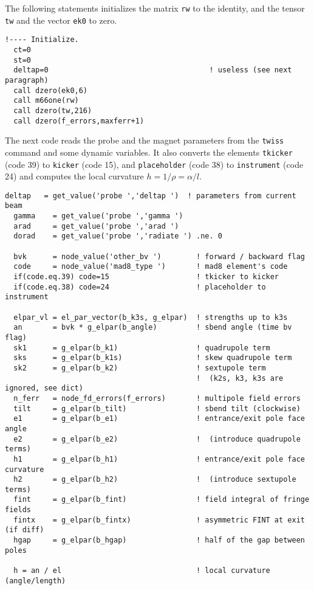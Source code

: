 \documentclass{cern-art} %
\renewcommand{\L}[1]{\lstinline[firstnumber=last]{#1}}
\begin{document}
The following statements initializes the matrix \L{rw} to the identity, and the tensor \L{tw} and the vector \L{ek0} to zero.
\begin{lstlisting}[firstnumber=last]
  !---- Initialize.
  ct=0
  st=0
  deltap=0                                     ! useless (see next paragraph)
  call dzero(ek0,6)
  call m66one(rw)
  call dzero(tw,216)
  call dzero(f_errors,maxferr+1)
\end{lstlisting}
The next code reads the probe and the magnet parameters from the \L{twiss} command and some dynamic variables. It also converts the elements \L{tkicker} (code 39) to \L{kicker} (code 15), and \L{placeholder} (code 38) to \L{instrument} (code 24) and computes the local curvature $h=1/\rho=\alpha/l$.
\begin{lstlisting}[firstnumber=last]
  deltap   = get_value('probe ','deltap ')  ! parameters from current beam
  gamma    = get_value('probe ','gamma ')
  arad     = get_value('probe ','arad ')
  dorad    = get_value('probe ','radiate ') .ne. 0
  
  bvk      = node_value('other_bv ')        ! forward / backward flag
  code     = node_value('mad8_type ')       ! mad8 element's code
  if(code.eq.39) code=15                    ! tkicker to kicker
  if(code.eq.38) code=24                    ! placeholder to instrument

  elpar_vl = el_par_vector(b_k3s, g_elpar)  ! strengths up to k3s
  an       = bvk * g_elpar(b_angle)         ! sbend angle (time bv flag)
  sk1      = g_elpar(b_k1)                  ! quadrupole term
  sks      = g_elpar(b_k1s)                 ! skew quadrupole term
  sk2      = g_elpar(b_k2)                  ! sextupole term
                                            !  (k2s, k3, k3s are ignored, see dict)
  n_ferr   = node_fd_errors(f_errors)       ! multipole field errors
  tilt     = g_elpar(b_tilt)                ! sbend tilt (clockwise)
  e1       = g_elpar(b_e1)                  ! entrance/exit pole face angle
  e2       = g_elpar(b_e2)                  !  (introduce quadrupole terms)
  h1       = g_elpar(b_h1)                  ! entrance/exit pole face curvature
  h2       = g_elpar(b_h2)                  !  (introduce sextupole terms)
  fint     = g_elpar(b_fint)                ! field integral of fringe fields
  fintx    = g_elpar(b_fintx)               ! asymmetric FINT at exit (if diff)
  hgap     = g_elpar(b_hgap)                ! half of the gap between poles

  h = an / el                               ! local curvature (angle/length)
\end{lstlisting}
\end{document}
